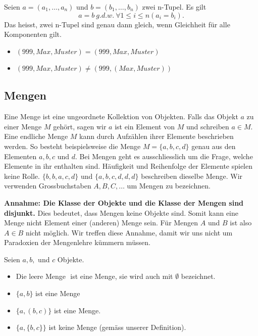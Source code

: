 \documentclass[../DatenbankenFS23.tex]{subfiles}
\begin{document}
\begin{defn}
    Seien $a = (a_1, \dots , a_n)$ und $b = (b_1, \dots , b_n)$ zwei n-Tupel. Es gilt
\[a = b\ g.d.w.\ \forall 1 \leq i \leq n(a_i = b_i).\]
Das heisst, zwei n-Tupel sind genau dann gleich, wenn Gleichheit f\"ur alle
Komponenten gilt.
\end{defn}

\begin{beispiel}
   \begin{itemize}
       \item $(999, Max, Muster) = (999, Max, Muster) $
       \item $(999, Max, Muster) \neq (999, (Max, Muster)) $
   \end{itemize}
\end{beispiel}

\subsection{Mengen}
Eine Menge ist eine ungeordnete Kollektion von Objekten. Falls das
Objekt $a$ zu einer Menge $M$ geh\"ort, sagen wir $a$ ist ein Element von $M$
und schreiben $a \in M$. \newline
Eine endliche Menge $M$ kann durch Aufz\"ahlen ihrer Elemente beschrieben
werden. So besteht beispielsweise die Menge $M = \{a, b, c, d\}$ genau aus
den Elementen $a, b, c$ und $d$.\newline
Bei Mengen geht es ausschliesslich um die Frage, welche Elemente in ihr
enthalten sind. H\"aufigkeit und Reihenfolge der Elemente spielen keine Rolle.\newline
$\{b, b, a, c, d\}$ und $\{a, b, c, d, d, d\}$\newline
beschreiben dieselbe Menge.\newline
Wir verwenden Grossbuchstaben $A, B, C, \dots$ um Mengen zu bezeichnen.

\begin{wichtig}
\textbf{Annahme: Die Klasse der Objekte und die Klasse der Mengen sind disjunkt.}
Dies bedeutet, dass Mengen keine Objekte sind. Somit kann eine Menge
nicht Element einer (anderen) Menge sein.
F\"ur Mengen $A$ und $B$ ist also $A \in B$ nicht m\"oglich.
Wir treffen diese Annahme,
damit wir uns nicht um
Paradoxien der Mengenlehre
k\"ummern m\"ussen.
\end{wichtig}

\begin{beispiel}
    Seien $a, b,$ und $c$ Objekte.
    \begin{itemize}
        \item Die leere Menge ${}$ ist eine Menge, sie wird auch mit $\emptyset$ bezeichnet.
        \item $\{a, b\}$ ist eine Menge
        \item $\{a,(b, c)\}$ ist eine Menge.
        \item $\{a, \{b, c\}\}$ ist keine Menge (gem\"ass unserer Definition).
    \end{itemize}
 \end{beispiel}
\end{document}

